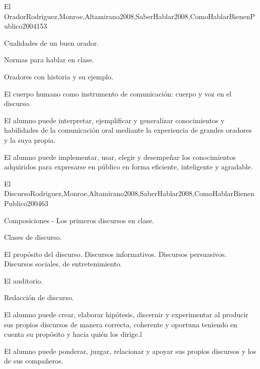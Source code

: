 \begin{syllabus}
\begin{unit}{El Orador}{Rodriguez,Monroe,Altamirano2008,SaberHablar2008,ComoHablarBienenPublico2004}{15}{3}
\begin{topics}
	\item Cualidades de un buen orador.
	\item Normas para hablar en clase.
	\item Oradores con historia y su ejemplo.
	\item El cuerpo humano como instrumento de comunicación: cuerpo y voz en el discurso.
\end{topics}
\begin{unitgoals}
	\item El alumno puede interpretar, ejemplificar y generalizar
conocimientos y habilidades de la comunicación oral mediante la experiencia de grandes oradores y la suya propia.
	\item El alumno puede implementar, usar, elegir y desempeñar los conocimientos adquiridos para  expresarse en público en forma eficiente, inteligente y agradable.
\end{unitgoals}
\end{unit}

\begin{unit}{El Discurso}{Rodriguez,Monroe,Altamirano2008,SaberHablar2008,ComoHablarBienenPublico2004}{6}{3}
\begin{topics}
	\item Composiciones - Los primeros discursos en clase.
	\item Clases de discurso.
	\item El propósito del discurso. Discursos informativos. Discursos persuasivos. Discursos sociales, de entretenimiento.
	\item El auditorio.	
	\item Redacción de discurso.
\end{topics}
\begin{unitgoals}
	\item El alumno puede crear, elaborar hipótesis, discernir y experimentar al producir sus propios discursos de manera correcta, coherente y oportuna teniendo en cuenta su propósito y hacia quién los dirige.l 
	\item El alumno puede ponderar, juzgar, relacionar y apoyar sus propios discursos y los de sus compañeros.
\end{unitgoals}
\end{unit}


\end{syllabus}
